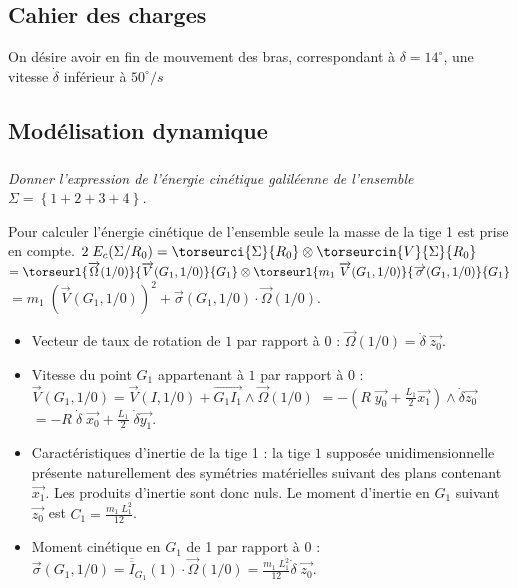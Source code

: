 \begin{multicols}{2}
\fi
\subsection*{Cahier des charges}

\ifprof
\else
On désire avoir en fin de mouvement des bras, correspondant à $\delta=14^{\circ}$, une vitesse $\dot{\delta}$ inférieur à $50^{\circ}/s$
\fi
\subsection*{Modélisation dynamique}

\subparagraph{}
\textit{Donner l'expression de l'énergie cinétique galiléenne de l'ensemble $\Sigma=\left\{1+2+3+4\right\}$.}
\ifprof
\begin{corrige}
Pour calculer l'énergie cinétique de l'ensemble seule la masse de la tige 1 est prise en compte.
$
2\;E_c(\Sigma/R_0)=\torseurci{\Sigma}{R_0}\otimes \torseurcin{V}{\Sigma}{R_0}$
$=\torseurl{\overrightarrow{\Omega}(1/0)}{\overrightarrow{V}(G_1,1/0)}{G_1}\otimes \torseurl{m_1\;\overrightarrow{V}(G_1,1/0)}{\overrightarrow{\sigma}(G_1,1/0)}{G_1}$
$=m_1\;\left(\overrightarrow{V}(G_1,1/0)\right)^2+\overrightarrow{\sigma}(G_1,1/0)\cdot \overrightarrow{\Omega}(1/0). 
$

\begin{itemize}
\item Vecteur de taux de rotation de $1$ par rapport à $0$ : $
\overrightarrow{\Omega}(1/0)=\dot{\delta}\;\overrightarrow{z_0}.
$

\item Vitesse du point $G_1$ appartenant à $1$ par rapport à $0$ : $
\overrightarrow{V}(G_1,1/0)=\overrightarrow{V}(I,1/0)+\overrightarrow{G_1I_1}\wedge\overrightarrow{\Omega}(1/0)$
$=-\left(R\;\overrightarrow{y_0}+\frac{L_1}{2}\overrightarrow{x_1}\right)\wedge\dot{\delta}\overrightarrow{z_0}$
$=-R\;\dot{\delta}\;\overrightarrow{x_0}+\frac{L_1}{2}\;\dot{\delta}\overrightarrow{y_1}$.


\item Caractéristiques d'inertie de la tige 1 : la tige $1$ supposée unidimensionnelle présente naturellement des symétries matérielles suivant des plans contenant $\overrightarrow{x_1}$. Les produits d'inertie sont donc nuls. Le moment d'inertie en $G_1$ suivant $\overrightarrow{z_0}$ est $C_1=\frac{m_1\;L_1^2}{12}$.

\item Moment cinétique en $G_1$ de 1 par rapport à 0 : $
\overrightarrow{\sigma}(G_1,1/0)=\overline{\overline{I}}_{G_1}(1)\cdot \overrightarrow{\Omega}(1/0)=\frac{m_1\;L_1^2}{12}\dot{\delta}\;\overrightarrow{z_0}
$.


\end{itemize}
\end{corrige}
\end{multicols}

